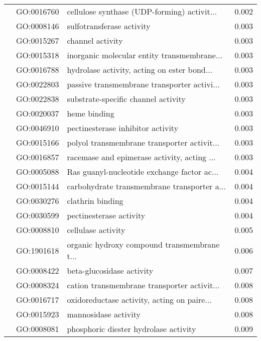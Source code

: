 \begin{longtable}{lllr}
   & GO:0016760 &  cellulose synthase (UDP-forming) activit... &         0.002 \\
   & GO:0008146 &                    sulfotransferase activity &         0.003 \\
   & GO:0015267 &                             channel activity &         0.003 \\
   & GO:0015318 &  inorganic molecular entity transmembrane... &         0.003 \\
   & GO:0016788 &  hydrolase activity, acting on ester bond... &         0.003 \\
   & GO:0022803 &  passive transmembrane transporter activi... &         0.003 \\
   & GO:0022838 &          substrate-specific channel activity &         0.003 \\
   & GO:0020037 &                                 heme binding &         0.003 \\
   & GO:0046910 &            pectinesterase inhibitor activity &         0.003 \\
   & GO:0015166 &  polyol transmembrane transporter activit... &         0.003 \\
   & GO:0016857 &  racemase and epimerase activity, acting ... &         0.003 \\
   & GO:0005088 &  Ras guanyl-nucleotide exchange factor ac... &         0.004 \\
   & GO:0015144 &  carbohydrate transmembrane transporter a... &         0.004 \\
   & GO:0030276 &                             clathrin binding &         0.004 \\
   & GO:0030599 &                      pectinesterase activity &         0.004 \\
   & GO:0008810 &                           cellulase activity &         0.005 \\
   & GO:1901618 &  organic hydroxy compound transmembrane t... &         0.006 \\
   & GO:0008422 &                    beta-glucosidase activity &         0.007 \\
   & GO:0008324 &  cation transmembrane transporter activit... &         0.008 \\
   & GO:0016717 &  oxidoreductase activity, acting on paire... &         0.008 \\
   & GO:0015923 &                         mannosidase activity &         0.008 \\
   & GO:0008081 &        phosphoric diester hydrolase activity &         0.009 \\

\end{longtable}
